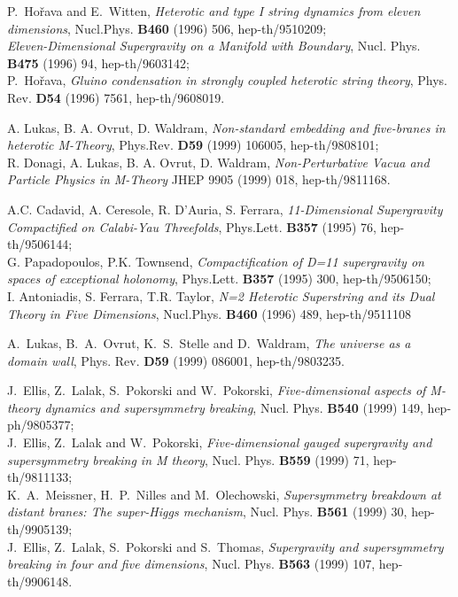 \documentclass[a4paper,11pt]{article}
\begin{document}
\begin{thebibliography}{99}

P.~Ho\v{r}ava and E.~Witten,
\emph{Heterotic and type I string dynamics from eleven dimensions},
Nucl.Phys. {\bf B460} (1996) 506, hep-th/9510209;\\
\emph{Eleven-Dimensional Supergravity on a Manifold with Boundary},
Nucl. Phys. {\bf B475} (1996) 94, hep-th/9603142;\\
P.~Ho\v{r}ava,
\emph{Gluino condensation in strongly coupled heterotic string theory},
Phys. Rev. {\bf D54} (1996) 7561, hep-th/9608019.

 A. Lukas, B. A. Ovrut, D. Waldram, 
\emph{Non-standard embedding and five-branes in heterotic
M-Theory},  Phys.Rev. \textbf{D59} (1999) 106005, hep-th/9808101;\\
 R. Donagi, A. Lukas, B. A. Ovrut, D. Waldram, 
\emph{Non-Perturbative Vacua and Particle Physics in M-Theory}
JHEP 9905 (1999) 018, hep-th/9811168.

A.C. Cadavid, A. Ceresole, R. D'Auria, S. Ferrara, \emph{
11-Dimensional Supergravity Compactified on Calabi-Yau
Threefolds}, Phys.Lett. \textbf{B357} (1995) 76, hep-th/9506144;\\
G. Papadopoulos, P.K. Townsend, \emph{Compactification of D=11 
supergravity on spaces of exceptional
holonomy}, Phys.Lett. \textbf{B357} (1995) 300, hep-th/9506150;\\
 I. Antoniadis, S. Ferrara, T.R. Taylor, \emph{N=2 Heterotic
 Superstring and its Dual Theory in Five
Dimensions},  Nucl.Phys. \textbf{B460} (1996) 489, hep-th/9511108 

A.~Lukas, B.~A.~Ovrut, K.~S.~Stelle and D.~Waldram,
\emph{The universe as a domain wall},
Phys. Rev. {\bf D59} (1999) 086001, hep-th/9803235.

J.~Ellis, Z.~Lalak, S.~Pokorski and W.~Pokorski,
\emph{Five-dimensional aspects of M-theory dynamics and supersymmetry
breaking},
Nucl. Phys. {\bf B540} (1999) 149, hep-ph/9805377;\\
J.~Ellis, Z.~Lalak and W.~Pokorski,
\emph{Five-dimensional gauged supergravity and supersymmetry breaking in
M theory},
Nucl. Phys. {\bf B559} (1999) 71, hep-th/9811133;\\
K.~A.~Meissner, H.~P.~Nilles and M.~Olechowski,
\emph{Supersymmetry breakdown at distant branes: The super-Higgs 
mechanism},
Nucl. Phys. {\bf B561} (1999) 30, hep-th/9905139;\\
J.~Ellis, Z.~Lalak, S.~Pokorski and S.~Thomas,
\emph{Supergravity and supersymmetry breaking in four and five
dimensions},
Nucl. Phys. {\bf B563} (1999) 107, hep-th/9906148.


\end{thebibliography}
\end{document}

